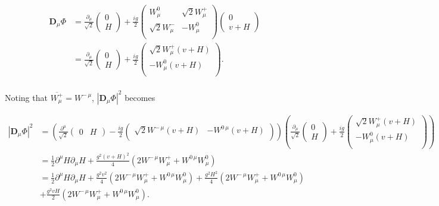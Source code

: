 \documentclass{article}
\begin{document}
\begin{equation}
\label{eqn:NASSBCD}
\begin{split}
\bm{D}_\mu \Phi& = \frac{\partial_\mu}{\sqrt{2}}\left(\begin{matrix}
0 \\
H
\end{matrix}\right) + \frac{ig}{2}\left(\begin{matrix}
W^{0}_\mu & \sqrt{2}W^{+}_\mu \\
\sqrt{2}W^{-}_\mu & -W^{0}_\mu\\
\end{matrix}\right)\left(\begin{matrix}
0 \\
v + H
\end{matrix}\right)\\
& = \frac{\partial_\mu}{\sqrt{2}}\left(\begin{matrix}
0 \\
H
\end{matrix}\right) + \frac{ig}{2}\left(\begin{matrix}
\sqrt{2}W^{+}_\mu(v+H) \\
-W^{0}_\mu(v+H)\\
\end{matrix}\right).\\
\end{split}
\end{equation}

Noting that $\overline{W^{+}_\mu} = W^{-\,\mu}$, $|\bm{D}_\mu\Phi|^2$ becomes

\begin{equation}
\begin{split}
|\bm{D}_\mu\Phi|^2 & =  \left( \frac{\partial^\mu}{\sqrt{2}}\left(\begin{matrix}
0 & H
\end{matrix}\right) - \frac{ig}{2}\left(\begin{matrix}
\sqrt{2}W^{-\,\mu}(v+H) & -W^{0\,\mu}(v+H)\\
\end{matrix}\right)\right)\left(\frac{\partial_\mu}{\sqrt{2}}\left(\begin{matrix}
0 \\
H
\end{matrix}\right) + \frac{ig}{2}\left(\begin{matrix}
\sqrt{2}W^{+}_\mu(v+H) \\
-W^{0}_\mu(v+H)\\
\end{matrix}\right)\right) \\
& = \frac{1}{2}\partial^\mu H \partial_\mu H + \frac{g^2 (v+H)^2}{4}(2W^{-\,\mu}W^{+}_\mu + W^{0\,\mu}W^{0}_\mu)\\
& = \frac{1}{2}\partial^\mu H \partial_\mu H + \frac{g^2v^2}{4}(2W^{-\,\mu}W^{+}_\mu + W^{0\,\mu}W^{0}_\mu) + \frac{g^2H^2}{4}(2W^{-\,\mu}W^{+}_\mu + W^{0\,\mu}W^{0}_\mu) \\
& + \frac{g^2vH}{2}(2W^{-\,\mu}W^{+}_\mu + W^{0\,\mu}W^{0}_\mu).
\end{split}
\end{equation}
\end{document}
